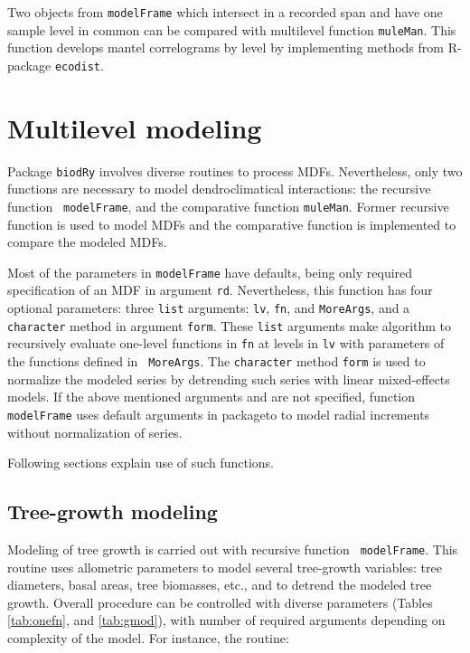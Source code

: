\documentclass[review,authoryear]{elsarticle}
\begin{document}
Two objects from {\tt modelFrame} which intersect in a recorded span
and have one sample level in common can be compared with multilevel
function {\tt muleMan}. This function develops mantel correlograms by
level by implementing methods from R-package {\tt ecodist}.

\section{Multilevel modeling}

Package {\tt biodRy} involves diverse routines to process
MDFs. Nevertheless, only two functions are necessary to model
dendroclimatical interactions: the recursive function {\tt
  modelFrame}, and the comparative function {\tt muleMan}. Former
recursive function is used to model MDFs and the comparative function
is implemented to compare the modeled MDFs.

Most of the parameters in {\tt modelFrame} have defaults, being only
required specification of an MDF in argument {\tt rd}. Nevertheless,
this function has four optional parameters: three {\tt list}
arguments: {\tt lv}, {\tt fn}, and {\tt MoreArgs}, and a {\tt
  character} method in argument {\tt form}. These {\tt list} arguments
make algorithm to recursively evaluate one-level functions in {\tt fn}
at levels in {\tt lv} with parameters of the functions defined in {\tt
  MoreArgs}. The {\tt character} method {\tt form} is used to
normalize the modeled series by detrending such series with linear
mixed-effects models. If the above mentioned arguments and are not
specified, function {\tt modelFrame} uses default arguments in
packageto to model radial increments without normalization of series.


Following sections explain use of such functions.

\subsection{Tree-growth modeling}\label{sec:growth}

Modeling of tree growth is carried out with recursive function {\tt
  modelFrame}. This routine uses allometric parameters to model
several tree-growth variables: tree diameters, basal areas, tree
biomasses, etc., and to detrend the modeled tree growth. Overall
procedure can be controlled with diverse parameters (Tables
\ref{tab:onefn}, and \ref{tab:gmod}), with number of required
arguments depending on complexity of the model. For instance, the
routine:
\end{document}
